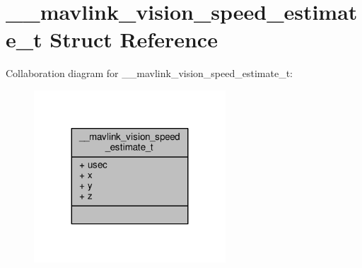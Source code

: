 \hypertarget{struct____mavlink__vision__speed__estimate__t}{\section{\+\_\+\+\_\+mavlink\+\_\+vision\+\_\+speed\+\_\+estimate\+\_\+t Struct Reference}
\label{struct____mavlink__vision__speed__estimate__t}
}


Collaboration diagram for \+\_\+\+\_\+mavlink\+\_\+vision\+\_\+speed\+\_\+estimate\+\_\+t\+:
\nopagebreak
\begin{figure}[H]
\begin{center}
\leavevmode
\includegraphics[width=203pt]{struct____mavlink__vision__speed__estimate__t__coll__graph}
\end{center}
\end{figure}

